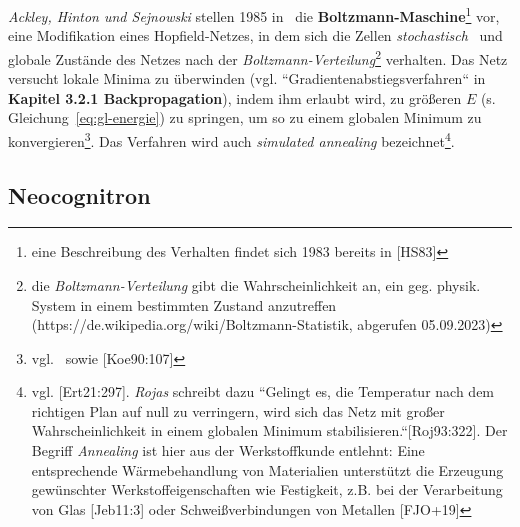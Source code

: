 \textit{Ackley, Hinton und Sejnowski} stellen 1985 in~\cite{AHS85} die \textbf{Boltzmann-Maschine}\footnote{
    eine Beschreibung des Verhalten findet sich 1983 bereits in [HS83]
} vor, eine Modifikation eines Hopfield-Netzes, in dem sich die Zellen \textit{stochastisch}~\cite[635]{AR88} und globale Zustände des Netzes nach der \textit{Boltzmann-Verteilung}\footnote{
    die \textit{Boltzmann-Verteilung} gibt die Wahrscheinlichkeit an, ein geg. physik. System in einem bestimmten Zustand anzutreffen (https://de.wikipedia.org/wiki/Boltzmann-Statistik, abgerufen  05.09.2023)
} verhalten. Das Netz versucht lokale Minima zu überwinden (vgl. ``Gradientenabstiegsverfahren`` in \textbf{Kapitel 3.2.1 Backpropagation}), indem ihm erlaubt wird, zu größeren $E$ (s. Gleichung~\ref{eq:gl-energie}) zu springen, um so zu einem globalen Minimum zu konvergieren\footnote{vgl.~\cite[151]{AHS85} sowie [Koe90:107]}.
Das Verfahren wird auch \textit{simulated annealing} bezeichnet\footnote{vgl. [Ert21:297]. \textit{Rojas} schreibt dazu
    ``Gelingt es, die Temperatur nach dem richtigen Plan auf null zu verringern, wird sich das Netz mit großer Wahrscheinlichkeit in einem globalen Minimum stabilisieren.``[Roj93:322]. Der Begriff \textit{Annealing} ist hier aus der Werkstoffkunde entlehnt: Eine entsprechende Wärmebehandlung von Materialien unterstützt die Erzeugung gewünschter Werkstoffeigenschaften wie Festigkeit, z.B.  bei der Verarbeitung von Glas [Jeb11:3] oder Schweißverbindungen von Metallen [FJO+19]
}.

\subsection{Neocognitron}

